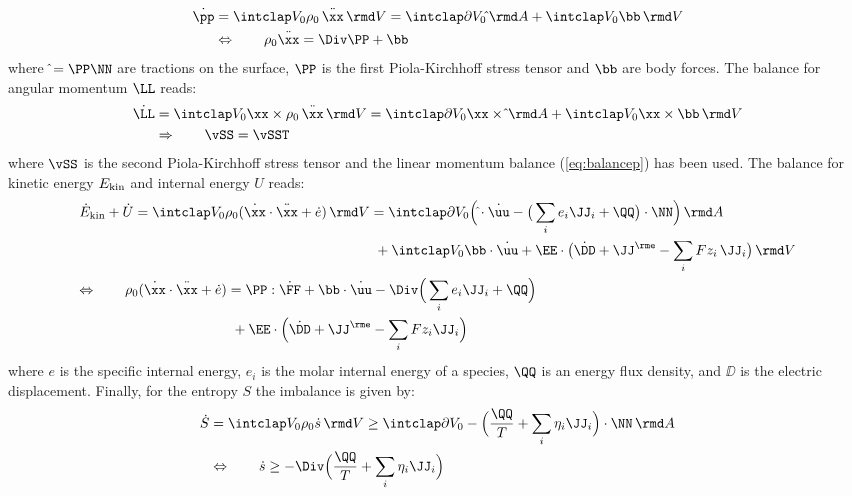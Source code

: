 \begin{align}
  \begin{aligned}
    \dot \pp  & = \intVO \rho_0 \,\ddot\xx \dV = \intdVO \hat\tt \dA + \intVO \bb \dV \\
              & \Leftrightarrow  \qquad \rho_0 \ddot\xx = \Div\PP + \bb
    \label{eq:balancep}
  \end{aligned}
\end{align}
where $\hat\tt=\PP\NN$ are tractions on the surface, $\PP$ is the first Piola-Kirchhoff stress tensor and $\bb$ are body forces. The balance for angular momentum $\LL$ reads:
\begin{align}
  \begin{aligned}
    \dot \LL  &= \intVO \xx \times \rho_0 \,\ddot\xx \dV  = \intdVO \xx \times \hat\tt \dA + \intVO \xx \times \bb \dV\\
              &\Rightarrow \qquad \vSS = \vSST
  \end{aligned}
\end{align}
where $\vSS$ is the second Piola-Kirchhoff stress tensor and the linear momentum balance (\cref{eq:balancep}) has been used. The balance for  kinetic energy $E_{\rm kin}$ and internal energy $U$ reads: 
\begin{align}
  \begin{aligned}
  &\begin{aligned}
  \dot E_{\rm kin} + \dot U = \intVO \rho_0(\dot\xx\cdot\ddot\xx + \dot e) \dV &= \intdVO \Big(\hat\tt\cdot\dot\uu -\big(\sum_i e_i \JJ_i+\QQ\big) \cdot \NN \Big) \dA \\
          & \ + \intVO \bb\cdot \dot\uu + \EE\cdot\big(\dot\DD+\JJ^\rme-\sum_i Fz_i\,\JJ_i\big) \dV \\
  \end{aligned} \\
  &\begin{aligned}
    \Leftrightarrow \qquad \rho_0(\dot\xx\cdot\ddot\xx+\dot e) &= \PP:\dot\FF + \bb \cdot \dot\uu - \Div\Big(\sum_i e_i \JJ_i+ \QQ \Big) \\
    & \ + \EE\cdot\Big(\dot \DD+\JJ^\rme-\sum_i Fz_i\JJ_i\Big) 
  \end{aligned}
  \end{aligned}
\end{align}
where $e$ is the specific internal energy, $e_i$ is the molar internal energy of a species, $\QQ$ is an energy flux density, and $\DD$ is the electric displacement. Finally, for the entropy $S$ the imbalance is given by: 
\begin{align}
  \begin{aligned}
    \dot S & = \intVO \rho_0 \dot s \dV \geq \intdVO -\Big(\frac{\QQ}{T} + \sum_i \eta_i\JJ_i\Big) \cdot \NN \dA \\
           & \Leftrightarrow \qquad \dot s \geq -\Div\Big(\frac{\QQ}{T}+\sum_i \eta_i \JJ_i \Big)
  \end{aligned}
\end{align}
